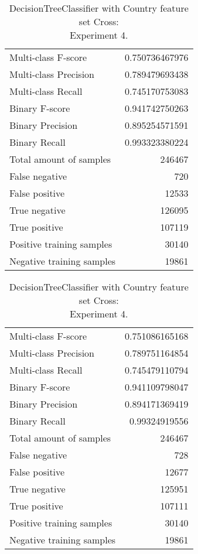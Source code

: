 \begin{table}[H]
\begin{minipage}{0.5\textwidth}
\caption{DecisionTreeClassifier with Country feature set Cross: \\Experiment 3.}
\centering
\begin{tabular}{l r}
\toprule
Multi-class F-score & 0.750736467976 \\
Multi-class Precision & 0.789479693438 \\
Multi-class Recall & 0.745170753083 \\
\midrule
Binary F-score & 0.941742750263 \\
Binary Precision & 0.895254571591 \\
Binary Recall & 0.993323380224 \\
\midrule
Total amount of samples & 246467 \\
False negative & 720 \\
False positive & 12533 \\
True negative & 126095 \\
True positive & 107119 \\
\midrule
Positive training samples & 30140 \\
Negative training samples & 19861 \\
\bottomrule
\end{tabular}
\end{minipage}
\hfillx
\begin{minipage}{0.5\textwidth}

\caption{DecisionTreeClassifier with Country feature set Cross: \\Experiment 4.}
\centering
\begin{tabular}{l r}
\toprule
Multi-class F-score & 0.751086165168 \\
Multi-class Precision & 0.789751164854 \\
Multi-class Recall & 0.745479110794 \\
\midrule
Binary F-score & 0.941109798047 \\
Binary Precision & 0.894171369419 \\
Binary Recall & 0.99324919556 \\
\midrule
Total amount of samples & 246467 \\
False negative & 728 \\
False positive & 12677 \\
True negative & 125951 \\
True positive & 107111 \\
\midrule
Positive training samples & 30140 \\
Negative training samples & 19861 \\
\bottomrule
\end{tabular}
\end{minipage}
\end{table}

